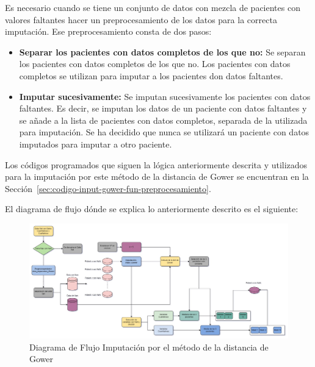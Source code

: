 Es necesario cuando se tiene un conjunto de datos con mezcla de pacientes con valores faltantes hacer un preprocesamiento de los datos para la correcta imputación. Ese preprocesamiento consta de dos pasos: 
\begin{itemize}
    \item \textbf{Separar los pacientes con datos completos de los que no:} Se separan los pacientes con datos completos de los que no. Los pacientes con datos completos se utilizan para imputar a los pacientes don datos faltantes.
    \item \textbf{Imputar sucesivamente:} Se imputan sucesivamente los pacientes con datos faltantes. Es decir, se imputan los datos de un paciente con datos faltantes y se añade a la lista de pacientes con datos completos, separada de la utilizada para imputación. Se ha decidido que nunca se utilizará un paciente con datos imputados para imputar a otro paciente.
\end{itemize}

Los códigos programados que siguen la lógica anteriormente descrita y utilizados para la imputación por este método de la distancia de Gower se encuentran en la Sección~\ref{sec:codigo-input-gower-fun-preprocesamiento}.

El diagrama de flujo dónde se explica lo anteriormente descrito es el siguiente: 

\newpage
\thispagestyle{empty}

\begin{landscape}
    \begin{figure}[H]
        \centering
        \includegraphics[scale = 0.5]{./img/gower-diagram.jpg}
        \caption{Diagrama de Flujo Imputación por el método de la distancia de Gower}
        \label{fig:gower-diagram}
    \end{figure}
\end{landscape}
\restoregeometry 



